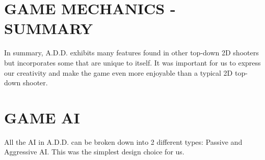 \documentclass{article}
\begin{document}
\section{GAME MECHANICS - SUMMARY \label{mechanicssumm}}
In summary, A.D.D. exhibits many features found in other top-down 2D shooters but incorporates some that are unique to itself. It was important for us to express our creativity and make the game even more enjoyable than a typical 2D top-down shooter.

\section{GAME AI \label{ai}}
All the AI in A.D.D. can be broken down into 2 different types: Passive and Aggressive AI. This was the simplest design choice for us. 
\end{document}
